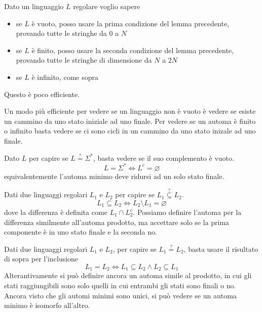 \documentclass[12pt]{article}
\begin{document}
Dato un linguaggio $L$ regolare voglio sapere 
\begin{itemize}
	\item se $L$ è vuoto, posso usare la prima condizione del lemma precedente, provando tutte le stringhe da 0 a $N$
	\item se $L$ è finito, posso usare la seconda condizione del lemma precedente, provando tutte le stringhe di dimensione da $N$ a $2N$
	\item se $L$ è infinito, come sopra
\end{itemize}
Questo è poco efficiente.

Un modo più efficiente per vedere se un linguaggio non è vuoto è vedere se esiste un cammino da uno stato iniziale ad uno finale.
Per vedere se un automa è finito o infinito basta vedere se ci sono cicli in un cammino da uno stato inizale ad uno finale.

Dato $L$ per capire se $L \overset{?}{=} \Sigma^*$, basta vedere se il suo complemento è vuoto.
$$ L = \Sigma^* \Leftrightarrow L^c = \varnothing $$
equivalentemente l'automa minimo deve ridursi ad un solo stato finale.

Dati due linguaggi regolari $L_1$ e $L_2$ per capire se $L_1 \overset{?}{\subseteq} L_2$.
$$ L_1 \subseteq L_2 \Leftrightarrow L_2 \setminus L_1 = \varnothing $$
dove la differenza è definita come $L_1 \cap L_2^c$.
Possiamo definire l'automa per la differenza similmente all'automa prodotto, ma accettare solo se la prima componente è in uno stato finale e la seconda no.

Dati due linguaggi regolari $L_1$ e $L_2$, per capire se $L_1 \overset{?}{=} L_2$, basta usare il risultato di sopra per l'inclusione
$$ L_1 = L_2 \Leftrightarrow L_1 \subseteq L_2 \wedge L_2 \subseteq L_1 $$
Alterantivamente si può definire ancora un automa simile al prodotto, in cui gli stati raggiungibili sono solo quelli in cui entrambi gli stati sono finali o no.
Ancora visto che gli automi minimi sono unici, si può vedere se un automa minimo è isomorfo all'altro.
\end{document}
